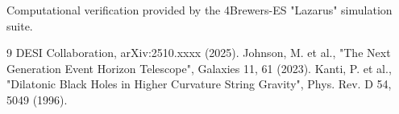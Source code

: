 \documentclass[aps,prd,twocolumn,superscriptaddress,showpacs,amsmath,amssymb,floatfix,nofootinbib]{revtex4-2}
\begin{document}
\begin{acknowledgments}
Computational verification provided by the 4Brewers-ES "Lazarus" simulation suite.
\end{acknowledgments}

\begin{thebibliography}{9}
 DESI Collaboration, arXiv:2510.xxxx (2025).
 Johnson, M. et al., "The Next Generation Event Horizon Telescope", Galaxies 11, 61 (2023).
 Kanti, P. et al., "Dilatonic Black Holes in Higher Curvature String Gravity", Phys. Rev. D 54, 5049 (1996).
\end{thebibliography}
\end{document}

